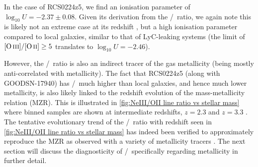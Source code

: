 \noindent In the case of RCS0224z5, we find an ionisation parameter of $\log_{10} U = -2.37 \pm 0.08$. Given its derivation from the \NeIII/\OII\ ratio, we again note this is likely not an extreme case at its redshift \citep[\cref{fig:NeIII/OII line ratio vs stellar mass}, and see similar estimates of $U$ at $z \sim 7$-$8$ in][]{2017MNRAS.464..469S}, but a high ionisation parameter compared to local galaxies, similar to that of LyC-leaking systems (the limit of $\OIIIf/\OII \geq 5$ translates to $\log_{10} U = -2.46$).

However, the \NeIII/\OII\ ratio is also an indirect tracer of the gas metallicity (being mostly anti-correlated with metallicity). The fact that RCS0224z5 (along with GOODSN-17940) has \NeIII/\OII\ much higher than local galaxies, and hence much lower metallicity, is also likely linked to the redshift evolution of the mass-metallicity relation (MZR). This is illustrated in \cref{fig:NeIII/OII line ratio vs stellar mass} where binned samples are shown at intermediate redshifts, $z = 2.3$ and $z = 3.3$ \citep[measurements from the MOSDEF survey;][]{2021ApJ...914...19S}. The tentative evolutionary trend of the \NeIII/\OII\ ratio with redshift seen in \cref{fig:NeIII/OII line ratio vs stellar mass} has indeed been verified to approximately reproduce the MZR as observed with a variety of metallicity tracers \citep[e.g.][]{2008A&A...488..463M}. The next section will discuss the diagnosticity of \NeIII/\OII\ specifically regarding metallicity in further detail.

